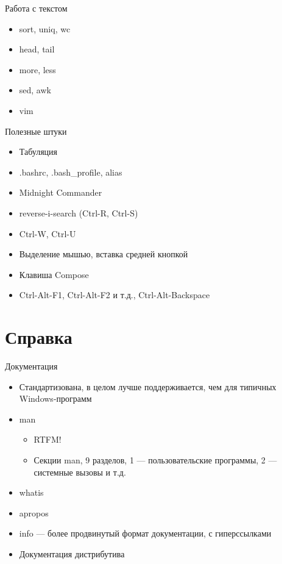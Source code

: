 \documentclass{../../slides-style}
\begin{document}
    \begin{frame}{Работа с текстом}
        \begin{itemize}
            \item sort, uniq, wc
            \item head, tail
            \item more, less
            \item sed, awk
            \item vim
        \end{itemize}
    \end{frame}

    \begin{frame}{Полезные штуки}
        \begin{itemize}
            \item Табуляция
            \item .bashrc, .bash\_profile, alias
            \item Midnight Commander
            \item reverse-i-search (Ctrl-R, Ctrl-S)
            \item Ctrl-W, Ctrl-U
            \item Выделение мышью, вставка средней кнопкой
            \item Клавиша Compose
            \item Ctrl-Alt-F1, Ctrl-Alt-F2 и т.д., Ctrl-Alt-Backspace
        \end{itemize}
    \end{frame}

    \section{Справка}

    \begin{frame}{Документация}
        \begin{itemize}
            \item Стандартизована, в целом лучше поддерживается, чем для типичных Windows-программ
            \item man
            \begin{itemize}
                \item RTFM!
                \item Секции man, 9 разделов, 1 --- пользовательские программы, 2 --- системные вызовы и т.д.
            \end{itemize}
            \item whatis
            \item apropos
            \item info --- более продвинутый формат документации, с гиперссылками
            \item Документация дистрибутива
        \end{itemize}
    \end{frame}
\end{document}
